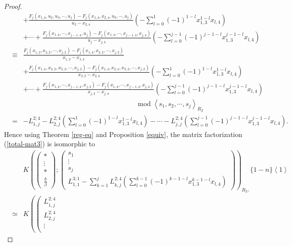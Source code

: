 \documentclass[10pt]{amsart}
\theoremstyle{break}
\begin{document}
\begin{proof}
\begin{eqnarray*}
&&+\frac{F_{j}(x_{1,4},u_2,u_3,\cdots,u_j)-F_{j}(x_{1,4},x_{2,4},u_3,\cdots,u_j)}{u_2-x_{2,4}}
\left(-\sum_{l=0}^{1}(-1)^{1-l}x_{1,3}^{1-l}x_{l,4}\right)\\
&&+\cdots +\frac{F_{j}(x_{1,4},\cdots,x_{j-1,4},u_j)-F_{j}(x_{1,4},\cdots,x_{j-1,4},x_{j,4})}{u_j-x_{j,4}}
\left(-\sum_{l=0}^{j-1}(-1)^{j-1-l}x_{1,3}^{j-1-l}x_{l,4}\right)\\
&\equiv&
\frac{F_{j}(x_{1,2},x_{2,2},\cdots,x_{j,2})-F_{j}(x_{1,4},x_{2,2},\cdots,x_{j,2})}{x_{1,2}-x_{1,4}}\\
&&+\frac{F_{j}(x_{1,4},x_{2,2},x_{3,2},\cdots,x_{j,2})-F_{j}(x_{1,4},x_{2,4},x_{3,2},\cdots,x_{j,2})}{x_{2,2}-x_{2,4}}
\left(-\sum_{l=0}^{1}(-1)^{1-l}x_{1,3}^{1-l}x_{l,4}\right)\\
&&+\cdots +\frac{F_{j}(x_{1,4},\cdots,x_{j-1,4},x_{j,2})-F_{j}(x_{1,4},\cdots,x_{j-1,4},x_{j,4})}{x_{j,2}-x_{j,4}}
\left(-\sum_{l=0}^{j-1}(-1)^{j-1-l}x_{1,3}^{j-1-l}x_{l,4}\right)\\
&&\hspace{7cm}{{\mathrm{mod\;}}} \left<s_1,s_2,\cdots,s_j\right>_{R_2\acute{}\,\acute{}}\\
&=&-L_{1,j}^{2;4}-L_{2,j}^{2;4}\left(\sum_{l=0}^{1}(-1)^{1-l}x_{1,3}^{1-l}x_{l,4}\right)-\cdots -L_{j,j}^{2;4}\left(\sum_{l=0}^{j-1}(-1)^{j-1-l}x_{1,3}^{j-1-l}x_{l,4}\right).
\end{eqnarray*}
Hence using Theorem \ref{reg-eq} and Proposition \ref{equiv}, the matrix factorization (\ref{total-mat3}) is isomorphic to
\begin{eqnarray*}
&&K\left(\left(
\begin{array}{c}
\ast\\[.5em]
\vdots\\[.5em]
\ast\\[.6em]
\frac{b}{\beta}
\end{array}
\right)
;
\left(
\begin{array}{c}
s_1\\[.5em]
\vdots\\[.5em]
s_j\\[.5em]
L_{1,1}^{3;1}-\sum_{k=1}^{j}L_{k,j}^{2;4}\left(\sum_{l=0}^{k-1}(-1)^{k-1-l}x_{1,3}^{k-1-l}x_{l,4}\right)
\end{array}
\right)
\right)_{R_2\acute{},\acute{}}\{1-n\}\left<1\right>\\
&\simeq&
K\left(\left(
\begin{array}{c}
L_{1,j}^{2;4}\\[.5em]
L_{2,j}^{2;4}\\[.8em]
\vdots\\[.5em]

\end{array}
\end{eqnarray*}
\end{proof}
\end{document}
